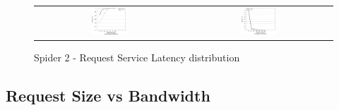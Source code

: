\begin{figure}[!t]
\centering
\begin{tabular}{cc}
{\includegraphics[width=0.24\textwidth]{./figs/spider2-reqLatCDF.eps}}&
{\includegraphics[width=0.24\textwidth]{./figs/spider2-reqLatPDF.eps}}\\
\end{tabular}
\vspace{-0.1in}
\centering
\caption{Spider 2 - Request Service Latency distribution}
\label{fig:spider1-reqLat}
\end{figure}




\subsection{Request Size vs Bandwidth}

 
